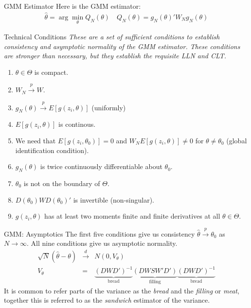 \documentclass[aspectratio=169]{beamer}
\begin{document}
\begin{frame}{GMM Estimator}
Here is the GMM estimator:
\begin{eqnarray*}
\hat{\theta} = \arg \min_{\theta}  Q_N(\theta) \quad Q_N(\theta)=g_N(\theta)' W_N  g_N(\theta)
\end{eqnarray*}

\end{frame}


\begin{frame}{Technical Conditions}
\textit{These are a set of sufficient conditions to establish consistency and asymptotic normality of the GMM estimator. These conditions are stronger than necessary, but they establish the requisite LLN and CLT.}
\begin{enumerate}
\item $\theta \in \Theta$ is compact.
\item $W_N \overset{p}{\to} W$.
\item $g_N(\theta) \overset{p}{\to} E[g(z_i,\theta)]$ (uniformly)
\item $E[g(z_i,\theta)]$ is continous.
\item We need that $E[g(z_i,\theta_0)]=0$ and $W_N E[g(z_i,\theta)] \neq 0$ for $\theta \neq \theta_0$ (global identification condition).
\item $g_N(\theta)$ is twice continuously differentiable about $\theta_0$.
\item $\theta_0$ is not on the boundary of $\Theta$.
\item $D(\theta_0) W D(\theta_0)'$ is invertible (non-singular).
\item $g(z_i,\theta)$ has at least two moments finite and finite derivatives at all $\theta \in \Theta$.
\end{enumerate}
\end{frame}


\begin{frame}{GMM: Asymptotics}
The first five conditions give us consistency $\hat{\theta} \overset{p}{\to} \theta_0$ as $N \rightarrow \infty$. All nine conditions give us asymptotic normality.
\begin{eqnarray*}
\sqrt{N}(\hat{\theta}-\theta)  &\overset{d}{\to}& N(0,V_{\theta})\\
V_{\theta} &=& \underbrace{(D W D')^{-1}}_{\mbox{bread}} \underbrace{(D W S W' D')}_{\mbox{filling}}\underbrace{(D W D')^{-1}}_{\mbox{bread}} 
\end{eqnarray*}
It is common to refer parts of the variance as the \textit{bread} and the \textit{filling} or \textit{meat}, together this is referred to as the \textit{sandwich} estimator of the variance.
\end{frame}
\end{document}
